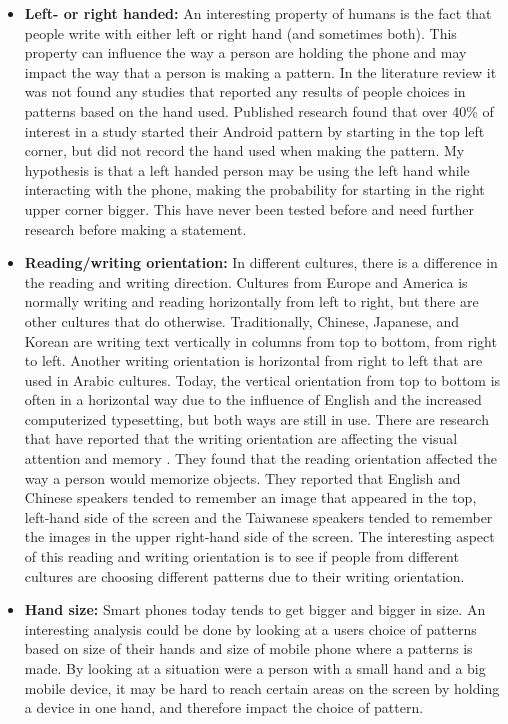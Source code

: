 \begin{itemize}
    \item {\bf Left- or right handed:} An interesting property of humans is the fact that people write with either left or right hand (and sometimes both). This property can influence the way a person are holding the phone and may impact the way that a person is making a pattern. In the literature review it was not found any studies that reported any results of people choices in patterns based on the hand used. Published research \cite{Uellenbeck} found that over 40\% of interest in a study started their Android pattern by starting in the top left corner, but did not record the hand used when making the pattern. My hypothesis is that a left handed person may be using the left hand while interacting with the phone, making the probability for starting in the right upper corner bigger. This have never been tested before and need further research before making a statement. 
    \item {\bf Reading/writing orientation:} In different cultures, there is a difference in the reading and writing direction. Cultures from Europe and America is normally writing and reading horizontally from left to right, but there are other cultures that do otherwise. Traditionally, Chinese, Japanese, and Korean are writing text vertically in columns from top to bottom, from right to left. Another writing orientation is horizontal from right to left that are used in Arabic cultures. Today, the vertical orientation from top to bottom is often in a horizontal way due to the influence of English and the increased computerized typesetting, but both ways are still in use. There are research that have reported that the writing orientation are affecting the visual attention and memory \cite{Chan}. They found that the reading orientation affected the way a person would memorize objects. They reported that English and Chinese speakers tended to remember an image that appeared in the top, left-hand side of the screen and the Taiwanese speakers tended to remember the images in the upper right-hand side of the screen. The interesting aspect of this reading and writing orientation is to see if people from different cultures are choosing different patterns due to their writing orientation.
    \item {\bf Hand size:} Smart phones today tends to get bigger and bigger in size. An interesting analysis could be done by looking at a users choice of patterns based on size of their hands and size of mobile phone where a patterns is made. By looking at a situation were a person with a small hand and a big mobile device, it may be hard to reach certain areas on the screen by holding a device in one hand, and therefore impact the choice of pattern. 
  \end{itemize}

